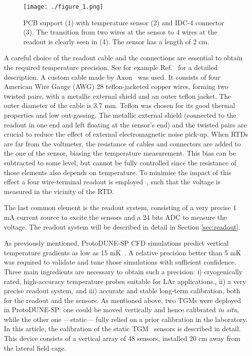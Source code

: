 \begin{figure}[htbp]
\begin{center}
\texttt{[image: ./figure\_1.png]}%
\caption{PCB support (1) with temperature sensor (2) and IDC-4 connector (3). The transition from two wires at the sensor to 4 wires at the readout is clearly seen in (4). The sensor has a length of 2 cm.
\label{fig:sensor}}
\end{center}
\end{figure}

A careful choice of the readout cable and the connections are essential to obtain the required temperature precision. See for example Ref.~\cite{minco} for a detailed description. A custom cable made by Axon~\cite{axon} was used. It consists of four American Wire Gauge (AWG) 28 teflon-jacketed copper wires, forming two twisted pairs, with a metallic external shield and an outer teflon jacket. The outer diameter of the cable is 3.7 mm. Teflon was chosen for its good thermal properties and low out-gassing. The metallic external shield (connected to the readout in one end and left floating at the sensor's end) and the twisted pairs are crucial to reduce the effect of external electromagnetic noise pick-up. When RTDs are far from the voltmeter, the resistance of cables and connectors are added to the one of the sensor, biasing the temperature measurement. This bias can be subtracted to some level, but cannot be fully controlled since the resistance of those elements also depends on temperature. To minimise the impact of this effect a four wire-terminal readout is employed~\cite{minco}, such that the voltage is measured in the vicinity of the RTD.

The last common element is the readout system, consisting of a very precise 1 mA current source to excite the sensors and a 24 bits ADC to measure the voltage. The readout system will be described in detail in Section \ref{sec:readout}.

As previously mentioned, ProtoDUNE-SP CFD simulations predict vertical temperature gradients as low as 15 mK~\cite{pdsp_tdr}. A relative precision better than 5 mK was required to validate and tune those simulations with sufficient confidence. Three main ingredients are necessary to obtain such a precision: i) cryogenically rated, high-accuracy temperature probes suitable for LAr applications., ii) a very precise readout system, and iii) accurate and stable long-term calibration, both for the readout and the sensors. As mentioned above, two TGMs were deployed in ProtoDUNE-SP: one could be moved vertically and hence calibrated \textit{in situ}, while the other one ---static--- fully relied on a prior calibration in the laboratory. In this article, the calibration of the static TGM~\cite{tfm} sensors is described in detail. This device consists of a vertical array of 48 sensors, installed 20 cm away from the lateral field cage.

